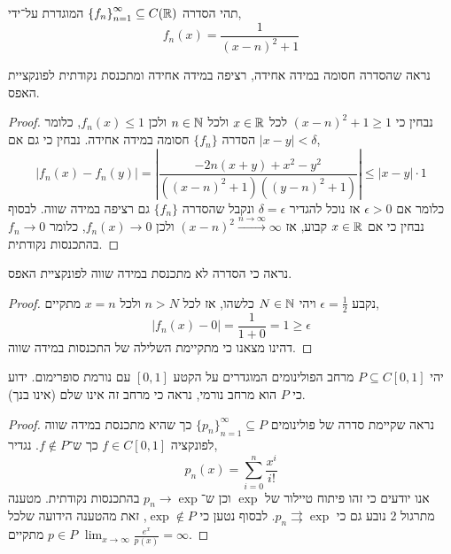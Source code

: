 \question{}
תהי הסדרה ${\{ f_n \}}_{n = 1}^\infty \subseteq C(\mathbb{R})$ המוגדרת על־ידי,
\[
	f_n(x)
	= \frac{1}{{(x - n)}^2 + 1}
\]

\subquestion{}
נראה שהסדרה חסומה במידה אחידה, רציפה במידה אחידה ומתכנסת נקודתית לפונקציית האפס.
\begin{proof}
	נבחין כי ${(x - n)}^2 + 1 \ge 1$ לכל $x \in \mathbb{R}$ ולכל $n \in \mathbb{N}$ ולכן $f_n(x) \le 1$, כלומר הסדרה $\{ f_n \}$ חסומה במידה אחידה.
	נבחין כי גם אם $|x - y| < \delta$,
	\[
		|f_n(x) - f_n(y)|
		= \left\lvert \frac{-2n (x + y) + x^2 - y^2}{({(x - n)}^2 + 1)({(y - n)}^2 + 1)} \right\rvert
		\le |x - y| \cdot 1
	\]
	כלומר אם $\epsilon > 0$ אז נוכל להגדיר $\delta = \epsilon$ ונקבל שהסדרה $\{ f_n \}$ גם רציפה במידה שווה.
	לבסוף נבחין כי אם $x \in \mathbb{R}$ קבוע, אז ${(x - n)}^2 \xrightarrow{n \to \infty} \infty$ ולכן $f_n(x) \to 0$, כלומר $f_n \to 0$ בהתכנסות נקודתית.
\end{proof}

\subquestion{}
נראה כי הסדרה לא מתכנסת במידה שווה לפונקציית האפס.
\begin{proof}
	נקבע $\epsilon = \frac{1}{2}$ ויהי $N \in \mathbb{N}$ כלשהו, אז לכל $n > N$ ולכל $x = n$ מתקיים,
	\[
		|f_n(x) - 0|
		= \frac{1}{1 + 0}
		= 1
		\ge \epsilon
	\]
	דהינו מצאנו כי מתקיימת השלילה של התכנסות במידה שווה.
\end{proof}

\question{}
יהי $P \subseteq C[0, 1]$ מרחב הפולינומים המוגדרים על הקטע $[0, 1]$ עם נורמת סופרימום.
ידוע כי $P$ הוא מרחב נורמי, נראה כי מרחב זה אינו שלם (אינו בנך).
\begin{proof}
	נראה שקיימת סדרה של פולינומים ${\{ p_n \}}_{n = 1}^\infty \subseteq P$ כך שהיא מתכנסת במידה שווה לפונקציה $f \in C[0, 1]$ כך ש־$f \notin P$.
	נגדיר,
	\[
		p_n(x) = \sum_{i = 0}^n \frac{x^i}{i!} 
	\]
	אנו יודעים כי זהו פיתוח טיילור של $\exp$ וכן ש־$p_n \to \exp$ בהתכנסות נקודתית.
	מטענה מתרגול 2 נובע גם כי $p_n \rightrightarrows \exp$.
	לבסוף נטען כי $\exp \notin P$, זאת מהטענה הידועה שלכל $p \in P$ מתקיים $\lim_{x \to \infty} \frac{e^x}{p(x)} = \infty$.
\end{proof}


